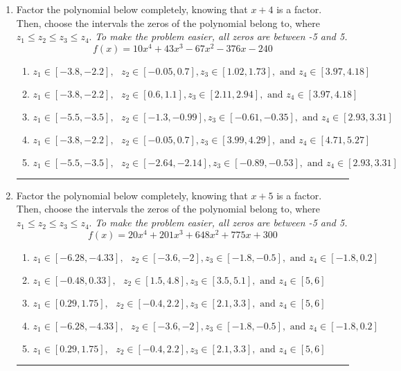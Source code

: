 \documentclass[14pt]{extbook}
\newcommand{\litem}[1]{\item#1\hspace*{-1cm}\rule{\textwidth}{0.4pt}}
\begin{document}
\begin{enumerate}
{\begin{enumerate}[label=\Alph*.]
\end{enumerate} }
\litem{
Factor the polynomial below completely, knowing that $x+4$ is a factor. Then, choose the intervals the zeros of the polynomial belong to, where $z_1 \leq z_2 \leq z_3 \leq z_4$. \textit{To make the problem easier, all zeros are between -5 and 5.}\[ f(x) = 10x^{4} +43 x^{3} -67 x^{2} -376 x -240 \]\begin{enumerate}[label=\Alph*.]
\item \( z_1 \in [-3.8, -2.2], \text{   }  z_2 \in [-0.05, 0.7], z_3 \in [1.02, 1.73], \text{   and   } z_4 \in [3.97, 4.18] \)
\item \( z_1 \in [-3.8, -2.2], \text{   }  z_2 \in [0.6, 1.1], z_3 \in [2.11, 2.94], \text{   and   } z_4 \in [3.97, 4.18] \)
\item \( z_1 \in [-5.5, -3.5], \text{   }  z_2 \in [-1.3, -0.99], z_3 \in [-0.61, -0.35], \text{   and   } z_4 \in [2.93, 3.31] \)
\item \( z_1 \in [-3.8, -2.2], \text{   }  z_2 \in [-0.05, 0.7], z_3 \in [3.99, 4.29], \text{   and   } z_4 \in [4.71, 5.27] \)
\item \( z_1 \in [-5.5, -3.5], \text{   }  z_2 \in [-2.64, -2.14], z_3 \in [-0.89, -0.53], \text{   and   } z_4 \in [2.93, 3.31] \)

\end{enumerate} }
\litem{
Factor the polynomial below completely, knowing that $x+5$ is a factor. Then, choose the intervals the zeros of the polynomial belong to, where $z_1 \leq z_2 \leq z_3 \leq z_4$. \textit{To make the problem easier, all zeros are between -5 and 5.}\[ f(x) = 20x^{4} +201 x^{3} +648 x^{2} +775 x + 300 \]\begin{enumerate}[label=\Alph*.]
\item \( z_1 \in [-6.28, -4.33], \text{   }  z_2 \in [-3.6, -2], z_3 \in [-1.8, -0.5], \text{   and   } z_4 \in [-1.8, 0.2] \)
\item \( z_1 \in [-0.48, 0.33], \text{   }  z_2 \in [1.5, 4.8], z_3 \in [3.5, 5.1], \text{   and   } z_4 \in [5, 6] \)
\item \( z_1 \in [0.29, 1.75], \text{   }  z_2 \in [-0.4, 2.2], z_3 \in [2.1, 3.3], \text{   and   } z_4 \in [5, 6] \)
\item \( z_1 \in [-6.28, -4.33], \text{   }  z_2 \in [-3.6, -2], z_3 \in [-1.8, -0.5], \text{   and   } z_4 \in [-1.8, 0.2] \)
\item \( z_1 \in [0.29, 1.75], \text{   }  z_2 \in [-0.4, 2.2], z_3 \in [2.1, 3.3], \text{   and   } z_4 \in [5, 6] \)


\end{enumerate}}
\end{enumerate}
\end{document}
